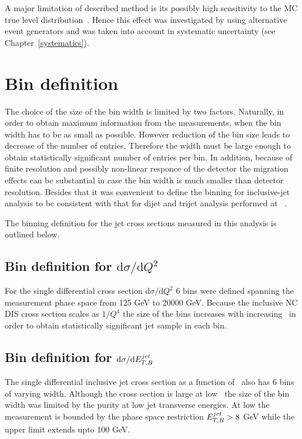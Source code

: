A major limitation of described method is its possibly high sensitivity to the MC true level distribution~\cite{cowan note}. Hence this effect was investigated by using alternative event generators and was taken into account in systematic uncertainty (see Chapter~\ref{systematics}).
\section{Bin definition}
\label{sec:bindef}
The choice of the size of the bin width is limited by two factors. Naturally, in order to obtain maximum information from the measurements, when the bin width has to be as small as possible. However reduction of the bin size leads to decrease of the number of entries. Therefore the width must be large enough to obtain statistically significant number of entries per bin. In addition, because of finite resolution and possibly non-linear responce of the detector the migration effects can be substantial in case the bin width is much smaller than detector resolution. Besides that it was convenient to define the binning for inclusive-jet analysis to be consistent with that for dijet and trijet analysis performed at \zeus~\cite{joerg Makarenko}.

The binning definition for the jet cross sections measured in this analysis is outlined below.
\subsection{Bin definition for ${\mathrm{d}\sigma}/{\mathrm{d}Q^2}$}
\label{subsec:bindefq2}
For the single differential cross section ${\mathrm{d}\sigma}/{\mathrm{d}Q^2}$ 6 bins were defined spanning the measurement phase space from 125 GeV to 20000 GeV. Because the inclusive NC DIS cross section scales as $1/Q^4$ the size of the bins increases with increasing \qsq~in order to obtain statistically significant jet sample in each bin.
\subsection{Bin definition for ${\mathrm{d}\sigma}/{\mathrm{d}\mbox{$E_{T,B}^{jet}$}}$}
\label{subsec:bindefet}
The single differential inclusive jet cross section as a function of \etjetb~also has 6 bins of varying width. Although the cross section is large at low \etjetb~the size of the bin width was limited by the purity at low jet transverse energies. At low \etjetb the measurement is bounded by the phase space restriction $\mbox{$E_{T,B}^{jet}$} > 8$ GeV while the upper limit extends upto 100 GeV.
